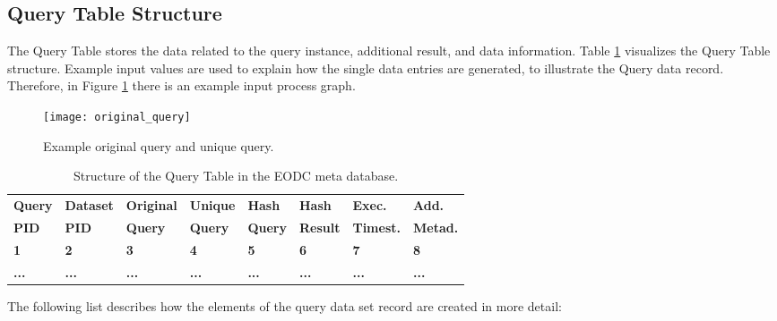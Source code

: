 \documentclass[draft,final]{vutinfth} %
\begin{document}
\subsection{Query Table Structure}

The Query Table stores the data related to the query instance, additional result, and data information. Table \ref{Tab:querytable} visualizes the Query Table structure. Example input values are used to explain how the single data entries are generated, to illustrate the Query data record. Therefore, in Figure \ref{fig:processgraph_example} there is an example input process graph.   

\begin{figure}[h]
	\centering
	\texttt{[image: original\_query]}
	\caption{Example original query and unique query.}
	\label{fig:processgraph_example} %
\end{figure} 

\begin{table}[]
	\caption{Structure of the Query Table in the EODC meta database.}
	\begin{tabular}{|l|l|l|l|l|l|l|l|}
	\hline	\textbf{Query} & \textbf{Dataset} & \textbf{Original} & \textbf{Unique} & \textbf{Hash} & \textbf{Hash} &
		\textbf{Exec.} & \textbf{Add.}  \\ 
		\textbf{PID} & \textbf{PID} & \textbf{Query} & \textbf{Query} & \textbf{Query} & \textbf{Result} &
		\textbf{Timest.} & \textbf{Metad.}  \\ \hline
		\textbf{1} & \textbf{2} & \textbf{3} & \textbf{4} & \textbf{5} & \textbf{6} &
		\textbf{7} & \textbf{8} \\ \hline
		\textbf{...} & \textbf{...} & \textbf{...} & \textbf{...} & \textbf{...} & \textbf{...} & \textbf{...} & \textbf{...} \\ \hline
	\end{tabular}
	\label{Tab:querytable}
\end{table}

The following list describes how the elements of the query data set record are created in more detail:
\end{document}
